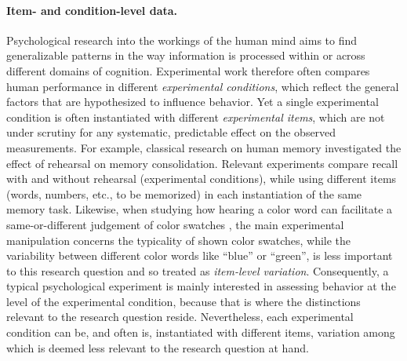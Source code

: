 \documentclass[fleqn]{article}
\begin{document}
\paragraph{Item- and condition-level data.}
Psychological research into the workings of the human mind aims to find generalizable patterns in the way information is processed within or across different domains of cognition.
Experimental work therefore often compares human performance in different \emph{experimental conditions}, which reflect the general factors that are hypothesized to influence behavior.
Yet a single experimental condition is often instantiated with different \emph{experimental items}, which are not under scrutiny for any systematic, predictable effect on the observed measurements.
For example, classical research on human memory \citep{AtkinsonShiffrin1968:Human-memory:-A} investigated the effect of rehearsal on memory consolidation.
Relevant experiments compare recall with and without rehearsal (experimental conditions), while using different items (words, numbers, etc., to be memorized) in each instantiation of the same memory task.
Likewise, when studying how hearing a color word can facilitate a same-or-different judgement of color swatches \citep{Rosch1975:The-Nature-of-M}, the main experimental manipulation concerns the typicality of shown color swatches, while the variability between different color words like ``blue'' or ``green'', is less important to this research question and so treated as \emph{item-level variation}.
Consequently, a typical psychological experiment is mainly interested in assessing behavior at the level of the experimental condition, because that is where the distinctions relevant to the research question reside.
Nevertheless, each experimental condition can be, and often is, instantiated with different items, variation among which is deemed less relevant to the research question at hand.
\end{document}
